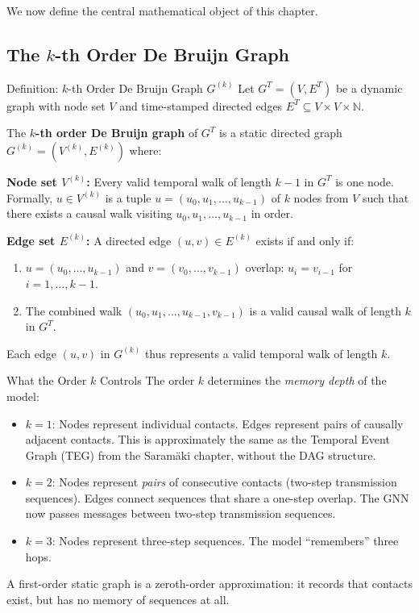 We now define the central mathematical object of this chapter.

\subsection{The $k$-th Order De Bruijn Graph}

\begin{mathbox}{Definition: $k$-th Order De Bruijn Graph $G^{(k)}$}
Let $G^T = (V, E^T)$ be a dynamic graph with node set $V$ and time-stamped directed edges
$E^T \subseteq V \times V \times \mathbb{N}$.

The \textbf{$k$-th order De Bruijn graph} of $G^T$ is a static directed graph
$G^{(k)} = (V^{(k)}, E^{(k)})$ where:

\medskip
\textbf{Node set $V^{(k)}$:} Every valid temporal walk of length $k-1$ in $G^T$ is one node.
Formally, $u \in V^{(k)}$ is a tuple $u = (u_0, u_1, \ldots, u_{k-1})$ of $k$ nodes from $V$
such that there exists a causal walk visiting $u_0, u_1, \ldots, u_{k-1}$ in order.

\medskip
\textbf{Edge set $E^{(k)}$:} A directed edge $(u, v) \in E^{(k)}$ exists if and only if:
\begin{enumerate}[noitemsep]
    \item $u = (u_0, \ldots, u_{k-1})$ and $v = (v_0, \ldots, v_{k-1})$ overlap: $u_i = v_{i-1}$
          for $i = 1, \ldots, k-1$.
    \item The combined walk $(u_0, u_1, \ldots, u_{k-1}, v_{k-1})$ is a valid causal walk of
          length $k$ in $G^T$.
\end{enumerate}
Each edge $(u, v)$ in $G^{(k)}$ thus represents a valid temporal walk of length $k$.
\end{mathbox}

\begin{keyinsight}{What the Order $k$ Controls}
The order $k$ determines the \emph{memory depth} of the model:
\begin{itemize}[noitemsep]
    \item $k = 1$: Nodes represent individual contacts. Edges represent pairs of causally
          adjacent contacts. This is approximately the same as the Temporal Event Graph (TEG)
          from the Saram\"aki chapter, without the DAG structure.
    \item $k = 2$: Nodes represent \emph{pairs} of consecutive contacts
          (two-step transmission sequences). Edges connect sequences that share a one-step
          overlap. The GNN now passes messages between two-step transmission sequences.
    \item $k = 3$: Nodes represent three-step sequences. The model ``remembers'' three hops.
\end{itemize}
A first-order static graph is a zeroth-order approximation: it records that contacts exist, but
has no memory of sequences at all.
\end{keyinsight}

